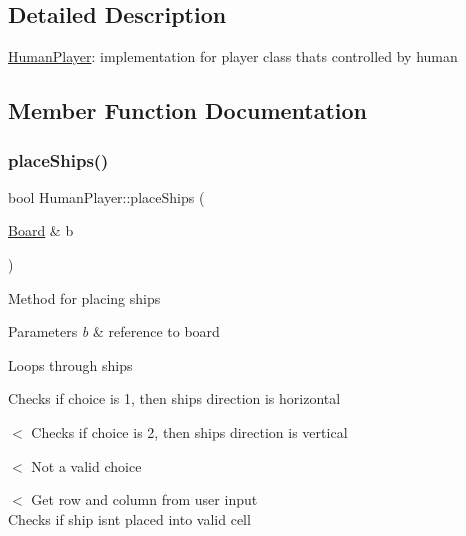 \subsection{Detailed Description}
\mbox{\hyperlink{class_human_player}{Human\+Player}}\+: implementation for player class that\textquotesingle{}s controlled by human 

\subsection{Member Function Documentation}
\mbox{\label{class_human_player_ae9315a3c66f6b2f2bf4d1ebb09669aff}} 
\subsubsection{\texorpdfstring{place\+Ships()}{placeShips()}}
{\footnotesize\ttfamily bool Human\+Player\+::place\+Ships (\begin{DoxyParamCaption}\item[{\mbox{\hyperlink{class_board}{Board}} \&}]{b }\end{DoxyParamCaption})\hspace{0.3cm}{\ttfamily [virtual]}}

Method for placing ships 
\begin{DoxyParams}{Parameters}
{\em b} & reference to board \\
\hline
\end{DoxyParams}
Loops through ships

Checks if choice is 1, then ship\textquotesingle{}s direction is horizontal

$<$ Checks if choice is 2, then ship\textquotesingle{}s direction is vertical

$<$ Not a valid choice

$<$ Get row and column from user input ~\newline
~\newline
~\newline
~\newline
~\newline
~\newline
~\newline
~\newline
~\newline
~\newline
~\newline
~\newline
~\newline
~\newline
~\newline
~\newline
~\newline
~\newline
~\newline
~\newline
~\newline
 Checks if ship isn\textquotesingle{}t placed into valid cell

